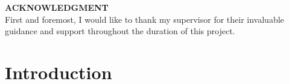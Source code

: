 \documentclass[\myFontSize,oneside,english,hidelinks,a4paper]{article}
\begin{document}
\newpage 			%
\setcounter{page}{4}
\vspace*{\fill} 
\noindent \Large \textbf{ACKNOWLEDGMENT}\\
\noindent First and foremost, I would like to thank my supervisor for their invaluable guidance and support throughout the duration of this project.
\vspace*{\fill} 
\vspace{-8cm} 





\newpage{} 
\setcounter{page}{5}
\renewcommand{\contentsname}{Table of Contents}
\tableofcontents



\newpage{}
\listoffigures
\listoftables
\printglossary[type=\acronymtype, title=List of Abbreviations]










\clearpage{} 
\setcounter{page}{1}

\section{Introduction}
\end{document}
